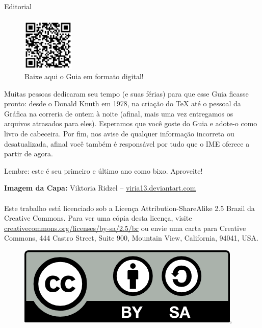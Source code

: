 \begin{editorial}{Editorial}
\paragraph{}
\begin{figure}
  \vspace{-30pt}
  \begin{center}
    \includegraphics[width=0.22\textwidth]{img/qrcode.pdf}
  \end{center}
  \vspace{-20pt}
  \caption{Baixe aqui o Guia em formato digital!}
  \vspace{-30pt}
\end{figure}
Muitas pessoas dedicaram seu tempo (e suas férias) para que esse Guia ficasse pronto: desde o
Donald Knuth em 1978, na criação do \TeX\makebox{} até o pessoal da Gráfica na correria de
ontem à noite (afinal, mais uma vez entregamos os arquivos atrasados para eles).
Esperamos que você goste do Guia e adote-o como livro de cabeceira. Por fim,
nos avise de qualquer informação incorreta ou desatualizada, afinal você também é
responsável por tudo que o IME oferece a partir de agora.

Lembre: este é seu primeiro e último ano como bixo. Aproveite!

{\bf Imagem da Capa:} Viktoria Ridzel -- \href{www.viria13.deviantart.com}{viria13.deviantart.com}


\paragraph{}
Este trabalho está licenciado sob a Licença Attribution-ShareAlike 2.5 Brazil
da Creative Commons. Para ver uma cópia desta licença,
visite \url{creativecommons.org/licenses/by-sa/2.5/br} ou envie uma
carta para Creative Commons, 444 Castro Street, Suite 900, Mountain View,
California, 94041, USA.
\\
\begin{figure}[H]
    \centering
    \includegraphics{img/cc/by-sa.png},
\end{figure}

\thispagestyle{empty}
\pagebreak
\end{editorial}


